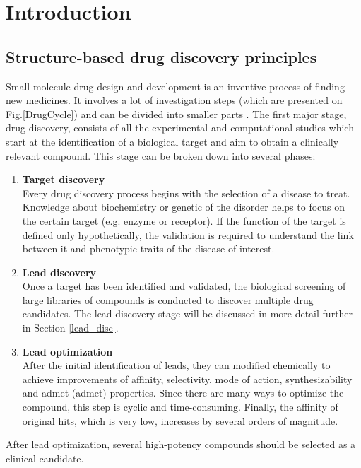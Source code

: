 \chapter{Introduction}
\section{Structure-based drug discovery principles}
Small molecule drug design and development is an inventive process of finding new medicines. 
It involves a lot of investigation steps (which are presented on Fig.\ref{DrugCycle}) and can be divided into smaller parts {\cite{Blass2015BasicDevelopment}}. 
The first major stage, drug discovery, consists of all the experimental and computational studies which start at the identification of a biological target and aim to obtain a clinically relevant compound.
This stage can be broken down into several phases:
\begin{enumerate}
    \item \textbf{Target discovery}\\
    Every drug discovery process begins with the selection of a disease to treat.
    Knowledge about biochemistry or genetic of the disorder helps to focus on the certain target (e.g. enzyme or receptor).
    If the function of the target is defined only hypothetically, the validation is required to understand the link between it and phenotypic traits of the disease of interest.
    \item \textbf{Lead discovery}\\
    Once a target has been identified and validated, the biological screening of large libraries of compounds is conducted to discover multiple drug candidates.
    The lead discovery stage will be discussed in more detail further in Section \ref{lead_disc}.
    \item \textbf{Lead optimization}\\
    After the initial identification of leads, they can modified chemically to achieve improvements of  affinity, selectivity, mode of action, synthesizability and \acrshort{admet} (\acrlong{admet})-properties.  
    Since there are many ways to optimize the compound, this step is cyclic and time-consuming. Finally, the affinity of \glqq original hits\grqq, which is very low, increases by several orders of magnitude.
\end{enumerate}

After lead optimization, several high-potency compounds should be selected as a clinical candidate.

